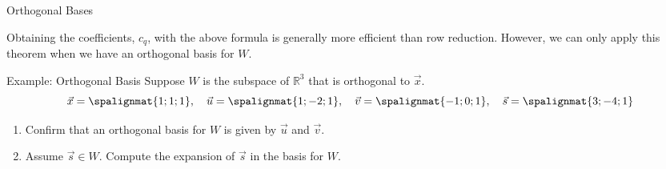 \begin{frame}{Orthogonal Bases}

    \vspace{-12pt}
    
    \begin{center}\end{center}
    \pause
    Obtaining the coefficients, $ \displaystyle c_ q$, with the above formula is generally more efficient than row reduction.  \pause However, we can only apply this theorem when we have an orthogonal basis for $W$. 
\end{frame}










\begin{frame}{Example: Orthogonal Basis}  
    \vspace{-6pt}
    Suppose $W$ is the subspace of $\mathbb R ^{3}$ that is orthogonal to $\vec x$. 
    $$\vec x = \spalignmat{1;1;1}, \quad \vec u = \spalignmat{1;-2;1}, \quad \vec v = \spalignmat{-1;0;1}, \quad \vec s = \spalignmat{3;-4;1}$$
    \begin{enumerate}
        \item Confirm that an orthogonal basis for $W$ is given by $\vec u$ and $\vec v$.
        \item Assume $\vec s \in W$. Compute the expansion of $\vec s$ in the basis for $W$.
    \end{enumerate}
\end{frame}


